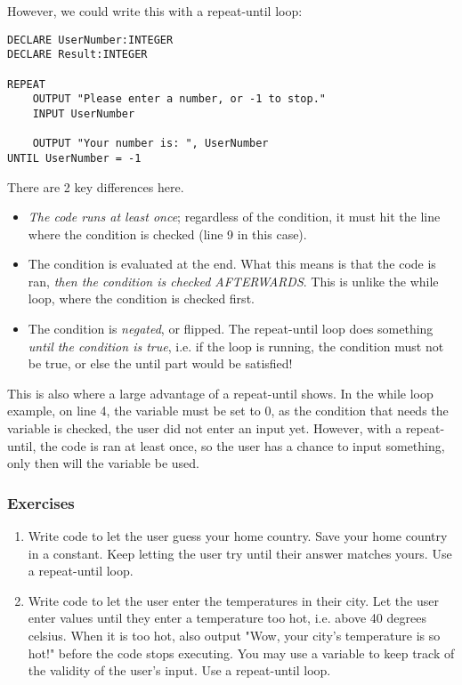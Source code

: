 \documentclass[./main.tex]{subfiles}
\begin{document}
However, we could write this with a repeat-until loop:

\begin{verbatim}
DECLARE UserNumber:INTEGER
DECLARE Result:INTEGER

REPEAT 
    OUTPUT "Please enter a number, or -1 to stop."
    INPUT UserNumber

    OUTPUT "Your number is: ", UserNumber
UNTIL UserNumber = -1
\end{verbatim}

There are 2 key differences here.

\begin{itemize}
    \item \emph{The code runs at least once}; regardless of the condition, it must hit the line where the condition is checked (line 9 in this case).
    \item The condition is evaluated at the end. What this means is that the code is ran, \emph{then the condition is checked AFTERWARDS}. This is unlike the while loop, where the condition is checked first.
    \item The condition is \emph{negated}, or flipped. The repeat-until loop does something \emph{until the condition is true}, i.e. if the loop is running, the condition must not be true, or else the until part would be satisfied!
\end{itemize}

This is also where a large advantage of a repeat-until shows. In the while loop example, on line 4, the variable must be set to 0, as the condition that needs the variable is checked, the user did not enter an input yet. However, with a repeat-until, the code is ran at least once, so the user has a chance to input something, only then will the variable be used.

\subsubsection{Exercises}
\label{ex:2_4_1}

\begin{enumerate}
    \item Write code to let the user guess your home country. Save your home country in a constant. Keep letting the user try until their answer matches yours. Use a repeat-until loop.
        \largelines
        \newpage
    \item Write code to let the user enter the temperatures in their city. Let the user enter values until they enter a temperature too hot, i.e. above 40 degrees celsius. When it is too hot, also output "Wow, your city's temperature is so hot!" before the code stops executing. You may use a variable to keep track of the validity of the user's input. Use a repeat-until loop.
        \largelines
\end{enumerate}
\end{document}
